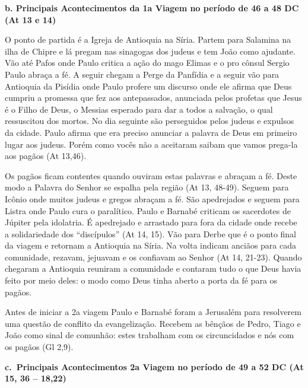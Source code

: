 \documentclass[
]{book}
\begin{document}
\textbf{b. Principais Acontecimentos da 1a Viagem no período de 46 a 48 DC (At 13 e 14)}

O ponto de partida é a Igreja de Antioquia na Síria. Partem para Salamina na ilha de Chipre e lá pregam nas sinagogas dos judeus e tem João como ajudante. Vão até Pafos onde Paulo critica a ação do mago Elimas e o pro cônsul Sergio Paulo abraça a fé. A seguir chegam a Perge da Panfídia e a seguir vão para Antioquia da Pisídia onde Paulo profere um discurso onde ele afirma que Deus cumpriu a promessa que fez aos antepassados, anunciada pelos profetas que Jesus é o Filho de Deus, o Messias esperado para dar a todos a salvação, o qual ressuscitou dos mortos. No dia seguinte são perseguidos pelos judeus e expulsos da cidade. Paulo afirma que era preciso anunciar a palavra de Deus em primeiro lugar aos judeus. Porém como vocês não a aceitaram saibam que vamos prega-la aos pagãos (At 13,46).

Os pagãos ficam contentes quando ouviram estas palavras e abraçam a fé. Deste modo a Palavra do Senhor se espalha pela região (At 13, 48-49). Seguem para Icônio onde muitos judeus e gregos abraçam a fé. São apedrejados e seguem para Listra onde Paulo cura o paralítico. Paulo e Barnabé criticam os sacerdotes de Júpiter pela idolatria. É apedrejado e arrastado para fora da cidade onde recebe a solidariedade dos ``discípulos'' (At 14, 15). Vão para Derbe que é o ponto final da viagem e retornam a Antioquia na Síria. Na volta indicam anciãos para cada comunidade, rezavam, jejuavam e os confiavam ao Senhor (At 14, 21-23). Quando chegaram a Antioquia reuniram a comunidade e contaram tudo o que Deus havia feito por meio deles: o modo como Deus tinha aberto a porta da fé para os pagãos.

Antes de iniciar a 2a viagem Paulo e Barnabé foram a Jerusalém para resolverem uma questão de conflito da evangelização. Recebem as bênçãos de Pedro, Tiago e João como sinal de comunhão: estes trabalham com os circuncidados e nós com os pagãos (Gl 2,9).

\textbf{c.~Principais Acontecimentos 2a Viagem no período de 49 a 52 DC (At 15, 36 -- 18,22)}
\end{document}
